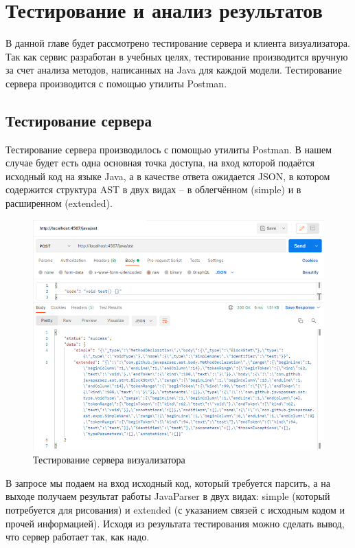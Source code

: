 \chapter{Тестирование и анализ результатов} \label{ch6}
В данной главе будет рассмотрено тестирование сервера и клиента визуализатора. Так как сервис разработан в учебных целях, тестирование производится вручную за счет анализа методов, написанных на Java для каждой модели. Тестирование сервера производится с помощью утилиты Postman.
\section{Тестирование сервера} \label{ch6:sec1}
Тестирование сервера производилось с помощью утилиты Postman. В нашем случае будет есть одна основная точка доступа, на вход которой подаётся исходный код на языке Java, а в качестве ответа ожидается JSON, в котором содержится структура AST в двух видах – в облегчённом (simple) и в расширенном (extended).

\begin{figure}[h]
	\center
	\includegraphics [scale=0.65] {my_folder/images/my/20}
	\caption{Тестирование сервера визуализатора} 
	\label{fig:20}  
\end{figure}

В запросе мы подаем на вход исходный код, который требуется парсить, а на выходе получаем результат работы JavaParser в двух видах: simple (который потребуется для рисования) и extended (с указанием связей с исходным кодом и прочей информацией). Исходя из результата тестирования можно сделать вывод, что сервер работает так, как надо.
